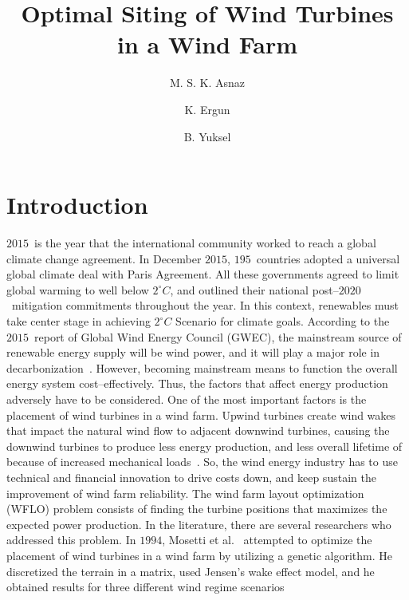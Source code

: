 \documentclass[]{iptconf}
\title{Optimal Siting of Wind Turbines in a Wind Farm}
\author[karasu@balikesir.edu.tr]{M. S. K. Asnaz}{1}
\author[kergun@balikesir.edu.tr]{K. Ergun}{1}
\author[byuksel@gelisim.edu.tr]{B. Yuksel}{2}
\affiliation{Balikesir University, Balikesir, Turkey}{1}
\affiliation{Istanbul Gelisim University, Istanbul, Turkey}{2}
\begin{document}





\section{Introduction} \label{sec:introduction}
$2015$~is the year that the international community worked to reach a global climate
change agreement. In December $2015$, $195$~countries adopted a universal global
climate deal with Paris Agreement. All these governments agreed to limit global 
warming to well below $2^\circ C$, and outlined their national post--$2020$~mitigation
commitments throughout the year. In this context, renewables must take center stage 
in achieving $2^\circ C$ Scenario for climate goals. According to the $2015$~report of Global
Wind Energy Council (GWEC), the mainstream source of renewable energy supply
will be wind power, and it will play a major role in decarbonization~\cite{GWEC2014}. However,
becoming mainstream means to function the overall energy system cost--effectively.
Thus, the factors that affect energy production adversely have to be considered.
One of the most important factors is the placement of wind turbines in a wind
farm. Upwind turbines create wind wakes that impact the natural wind flow to
adjacent downwind turbines, causing the downwind turbines to produce less energy
production, and less overall lifetime of because of increased mechanical loads~\cite{Diamond2011}.
So, the wind energy industry has to use technical and financial innovation to drive
costs down, and keep sustain the improvement of wind farm reliability.
The wind farm layout optimization (WFLO) problem consists of finding the
turbine positions that maximizes the expected power production. In the literature,
there are several researchers who addressed this problem. In $1994$, Mosetti et al.~\cite{Mosetti1994} 
attempted to optimize the placement of wind turbines in a wind farm by utilizing
a genetic algorithm. He discretized the terrain in a matrix, used Jensen's wake
effect model, and he obtained results for three different wind regime scenarios
\end{document}

